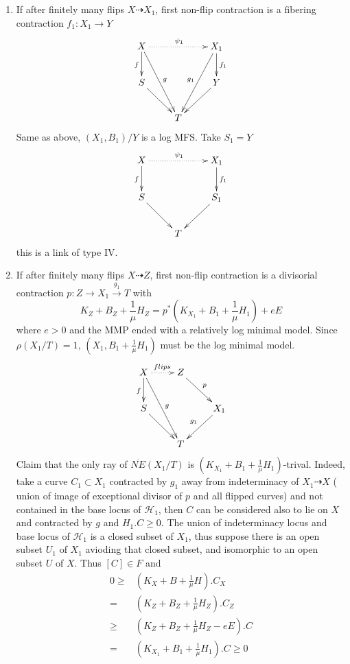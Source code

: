 \documentclass{article}
\begin{document}
\begin{enumerate}[(A)]
\begin{enumerate}[1)]
$${      &T&S_1\ar[l]_\sim}$$
      This is a link of type III.
    \item If after finitely many flips $ X\dashrightarrow X_1 $, first non-flip contraction is a fibering contraction $ f_1:X_1\to Y  $
      $$ \xymatrix{
        X\ar[d]_f\ar[ddr]^g\ar@{.>}[rr]^{\psi_1}&&X_1\ar[d]^{f_1}\ar[ddl]_{g_1}\\
        S\ar[dr]&&Y\ar[dl]\\
      &T &}$$
      Same as above, $ (X_1,B_1)/Y $ is a log MFS. Take $ S_1=Y $
      $$ \xymatrix{
        X\ar[d]_f\ar@{.>}[rr]^{\psi_1}&&X_1\ar[d]^{f_1}\\
        S\ar[dr]&&S_1\ar[dl]\\
      &T &}$$
      this is a link of type IV.
    \item If after finitely many flips $ X\dashrightarrow Z $, first non-flip contraction is a divisorial contraction $ p:Z\to X_1\xrightarrow{g_1}T $ with
      $$ K_Z+B_Z+\frac{1}{\mu}H_Z=p^*(K_{X_1}+B_1+\frac{1}{\mu}H_1)+eE $$
      where $ e>0 $ and the MMP ended with a relatively log minimal model. Since  $ \rho(X_1/T)=1 $, $ (X_1,B_1+\frac{1}{\mu}H_1) $ must be the log minimal model.
      $$ \xymatrix{
        X\ar[d]_f\ar[ddr]^g\ar@{.>}[r]^{flips}&Z\ar[rd]^{p}&\\
        S\ar[dr]&&X_1\ar[dl]_{g_1}\\
      &T&}$$
      Claim that the only ray of $ \overline{NE}(X_1/T) $ is $ (K_{X_1}+B_1+\frac{1}{\mu}H_1) $-trival. Indeed, take a curve $ C_1\subset X_1 $ contracted by $ g_1 $ away from indeterminacy of $ X_1\dashrightarrow X $ ( union of image of exceptional divisor of $ p $ and all flipped curves) and not contained in the base locus of $ \mathcal{H}_1 $, then $ C $ can be considered also to lie on $ X $ and contracted by $ g $ and $ H_1.C\geqslant 0 $.  The union of  indeterminacy locus and base locus of $ \mathcal{H}_1 $ is a closed subset of $ X_1 $, thus suppose there is an open subset $ U_1 $ of $ X_1 $ avioding that closed subset, and  isomorphic to an open subset $ U $ of $ X $. Thus $ [C]\in F $ and
      \begin{equation*}
        \begin{aligned}
          0\geqslant& (K_X+B+\frac{1}{\mu}H).C_X\\
          =&(K_Z+B_Z+\frac{1}{\mu}H_Z).C_Z\\
          \geqslant&(K_Z+B_Z+\frac{1}{\mu}H_Z-eE).C\\
          =&(K_{X_1}+B_1+\frac{1}{\mu}H_1).C\geqslant 0\\

\end{aligned}
\end{equation*}
\end{enumerate}
\end{enumerate}
\end{document}
